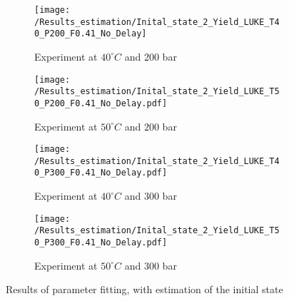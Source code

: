 \documentclass[../Article_Model_Parameters.tex]{subfiles}
\begin{document}
\begin{figure*}
	\centering
	\begin{subfigure}[b]{0.7\textwidth}
		\centering
		\texttt{[image: /Results\_estimation/Inital\_state\_2\_Yield\_LUKE\_T40\_P200\_F0.41\_No\_Delay]}
		\caption{Experiment at $40^\circ C$ and $200$ bar}
	\end{subfigure}
	\hfill
	\begin{subfigure}[b]{0.7\textwidth}
		\centering
		\texttt{[image: /Results\_estimation/Inital\_state\_2\_Yield\_LUKE\_T50\_P200\_F0.41\_No\_Delay.pdf]}
		\caption{Experiment at $50^\circ C$ and $200$ bar}
	\end{subfigure}
	\hfill
	\begin{subfigure}[b]{0.7\textwidth}
		\centering
		\texttt{[image: /Results\_estimation/Inital\_state\_2\_Yield\_LUKE\_T40\_P300\_F0.41\_No\_Delay.pdf]}
		\caption{Experiment at $40^\circ C$ and $300$ bar}
	\end{subfigure}
	\hfill
	\begin{subfigure}[b]{0.7\textwidth}
		\centering
		\texttt{[image: /Results\_estimation/Inital\_state\_2\_Yield\_LUKE\_T50\_P300\_F0.41\_No\_Delay.pdf]}
		\caption{Experiment at $50^\circ C$ and $300$ bar}
	\end{subfigure}
	\caption{Results of parameter fitting, with estimation of the initial state}
\end{figure*}
		
	
\end{document}
